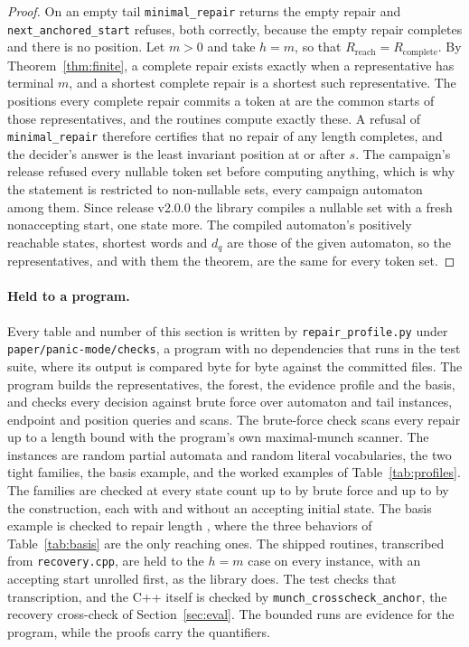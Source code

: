 \documentclass[11pt,a4paper]{article}
\theoremstyle{definition}
\theoremstyle{plain}
\theoremstyle{remark}
\newcommand{\code}[1]{\texttt{#1}}
\newcommand{\Rreach}{R_{\mathrm{reach}}}
\newcommand{\Rcomp}{R_{\mathrm{complete}}}
\begin{document}
\begin{proof}
On an empty tail \code{minimal\_repair} returns the empty repair and \code{next\_anchored\_start} refuses, both
correctly, because the empty repair completes and there is no position. Let $m > 0$ and take $h = m$, so that
$\Rreach = \Rcomp$. By Theorem~\ref{thm:finite}, a complete repair exists exactly when a representative has terminal
$m$, and a shortest complete repair is a shortest such representative. The positions every complete repair commits a
token at are the common starts of those representatives, and the routines compute exactly these. A refusal of
\code{minimal\_repair} therefore certifies that no repair of any length completes, and the decider's answer is the least
invariant position at or after $s$. The campaign's release refused every nullable token set before computing anything,
which is why the statement is restricted to non-nullable sets, every campaign automaton among them. Since release v2.0.0
the library compiles a nullable set with a fresh nonaccepting start, one state more. The compiled automaton's positively
reachable states, shortest words and $d_q$ are those of the given automaton, so the representatives, and with them the
theorem, are the same for every token set.
\end{proof}

\paragraph{Held to a program.} Every table and number of this section is written by \code{repair\_profile.py} under
\code{paper/panic-mode/checks}, a program with no dependencies that runs in the test suite, where its output is compared
byte for byte against the committed files. The program builds the representatives, the forest, the evidence profile and
the basis, and checks every decision against brute force over \ExactInstances{} automaton and tail instances,
\ExactQueries{} endpoint and position queries and \ExactScans{} scans. The brute-force check scans every repair up to a
length bound with the program's own maximal-munch scanner. The instances are random partial automata and random literal
vocabularies, the two tight families, the basis example, and the worked examples of Table~\ref{tab:profiles}. The
families are checked at every state count up to \ExactFamilyBrute{} by brute force and up to \ExactFamilyMax{} by the
construction, each with and without an accepting initial state. The basis example is checked to repair length
\ExactBasisBound{}, where the three behaviors of Table~\ref{tab:basis} are the only reaching ones. The shipped routines,
transcribed from \code{recovery.cpp}, are held to the $h = m$ case on every instance, with an accepting start unrolled
first, as the library does. The test checks that transcription, and the C++ itself is checked by
\code{munch\_crosscheck\_anchor}, the recovery cross-check of Section~\ref{sec:eval}. The bounded runs are evidence for
the program, while the proofs carry the quantifiers.
\end{document}
